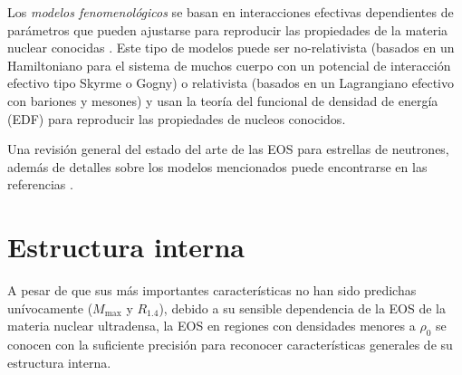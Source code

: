 Los \emph{modelos fenomenológicos} se basan en interacciones efectivas dependientes de parámetros que pueden ajustarse para reproducir las propiedades de la materia nuclear conocidas \cite{Baldo2012}. Este tipo de modelos puede ser no-relativista (basados en un Hamiltoniano para el sistema de muchos cuerpo con un potencial de interacción efectivo tipo Skyrme o Gogny) o relativista (basados en un Lagrangiano efectivo con bariones y mesones) y usan la teoría del funcional de densidad de energía (EDF) para reproducir las propiedades de nucleos conocidos.

Una revisión general del estado del arte de las EOS para estrellas de neutrones, además de detalles sobre los modelos mencionados puede encontrarse en las referencias \cite{Haensel2007,Rezzolla2018}.


\section{Estructura interna}\label{IntStr}
A pesar de que sus más importantes características no han sido predichas unívocamente ($M_{\text{max}}$ y $R_{1.4}$), debido a su sensible dependencia de la EOS de la materia nuclear ultradensa, %
la EOS en regiones con densidades menores a $\rho_0$ se conocen con la suficiente precisión \cite{Haensel2007,Chamel2008} para reconocer características generales de su estructura interna. 

